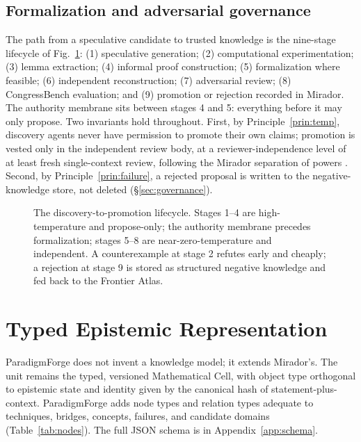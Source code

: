 \documentclass[11pt]{article}
\theoremstyle{definition}
\theoremstyle{remark}
\newcommand{\PF}{ParadigmForge}
\begin{document}
\subsection{Formalization and adversarial governance}
\label{sec:gov-path}

The path from a speculative candidate to trusted knowledge is the nine-stage lifecycle of
Fig.~\ref{fig:lifecycle}: (1) speculative generation; (2) computational experimentation;
(3) lemma extraction; (4) informal proof construction; (5) formalization where feasible;
(6) independent reconstruction; (7) adversarial review; (8) CongressBench evaluation; and
(9) promotion or rejection recorded in Mirador. The authority membrane sits between stages 4 and 5:
everything before it may only propose. Two invariants hold throughout. First, by
Principle~\ref{prin:temp}, discovery agents never have permission to promote their own claims;
promotion is vested only in the independent review body, at a reviewer-independence level of at
least fresh single-context review, following the Mirador separation of powers
\citep{lucius2026mirador,lucius2026congressbench}. Second, by Principle~\ref{prin:failure}, a
rejected proposal is written to the negative-knowledge store, not deleted (\S\ref{sec:governance}).

\begin{figure}[t]
\centering
\resizebox{\textwidth}{!}{}
\caption{The discovery-to-promotion lifecycle. Stages 1--4 are high-temperature and propose-only;
the authority membrane precedes formalization; stages 5--8 are near-zero-temperature and
independent. A counterexample at stage 2 refutes early and cheaply; a rejection at stage 9 is stored
as structured negative knowledge and fed back to the Frontier Atlas.}
\label{fig:lifecycle}
\end{figure}

\section{Typed Epistemic Representation}
\label{sec:repr}

\PF{} does not invent a knowledge model; it extends Mirador's. The unit remains the typed, versioned
Mathematical Cell, with object type orthogonal to epistemic state and identity given by the canonical
hash of statement-plus-context. \PF{} adds node types and relation types adequate to techniques,
bridges, concepts, failures, and candidate domains (Table~\ref{tab:nodes}). The full JSON schema is
in Appendix~\ref{app:schema}.
\end{document}
